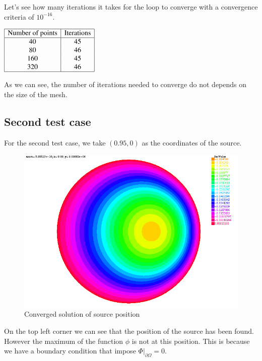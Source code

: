 Let's see how many iterations it takes for the  loop to converge with a convergence criteria of $10^{-16}$.\\
\begin{center}
$\begin{array}{|c|c|}
	\hline
	\text{Number of points} & \text{Iterations} \\
	\hline
	40 & 45\\
	80 & 46\\
	160 & 45 \\
	320 & 46\\
	\hline
\end{array}$
\end{center}

As we can see, the number of iterations needed to converge do not depends on the size of the mesh.

\subsection{Second test case}

For the second test case, we take $(0.95,0)$ as the coordinates of the source.\\
\begin{figure}[H]
	\centering
	\includegraphics[scale=0.7]{0950.png}
	\caption{Converged solution of source position}
	\label{0950}
\end{figure}
On the top left corner we can see that the position of the source has been found. However the maximum of the function $\phi$ is not at this position. This is because we have a boundary condition that impose $\left.\Phi\right|_{\partial\Omega}=0$.

 